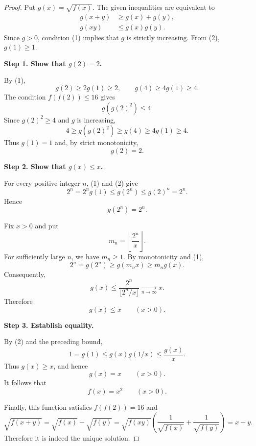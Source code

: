 
\begin{dlsummary}[title={\bfseries Solution 22. The Hidden Quadratic Function},breakable]

\begin{proof}
Put $g(x)=\sqrt{f(x)}$. The given inequalities
are equivalent to
\begin{align}
g(x+y)&\ge g(x)+g(y), \tag{1}\\
g(xy)&\le g(x)g(y). \tag{2}
\end{align}
Since $g>0$, condition (1) implies that $g$
is strictly increasing. From (2), $g(1)\ge1$.

\medskip
\noindent\textbf{Step 1. Show that $g(2)=2$.}

By (1),
\[
g(2)\ge2g(1)\ge2,\qquad
g(4)\ge4g(1)\ge4.
\]
The condition $f(f(2))\le16$ gives
\[
g(g(2)^2)\le4.
\]
Since $g(2)^2\ge4$ and $g$ is increasing,
\[
4\ge g(g(2)^2)\ge g(4)
\ge4g(1)\ge4.
\]
Thus $g(1)=1$ and, by strict monotonicity,
\[
\boxed{g(2)=2.}
\]

\medskip
\noindent\textbf{Step 2. Show that $g(x)\le x$.}

For every positive integer $n$, (1) and (2)
give
\[
2^n=2^n g(1)
\le g(2^n)\le g(2)^n=2^n.
\]
Hence
\[
\boxed{g(2^n)=2^n.}
\]

Fix $x>0$ and put
\[
m_n=\left\lfloor\frac{2^n}{x}\right\rfloor.
\]
For sufficiently large $n$, we have $m_n\ge1$.
By monotonicity and (1),
\[
2^n=g(2^n)\ge g(m_nx)\ge m_ng(x).
\]
Consequently,
\[
g(x)\le
\frac{2^n}{\lfloor2^n/x\rfloor}
\xrightarrow[n\to\infty]{}x.
\]
Therefore
\[
\boxed{g(x)\le x\qquad(x>0).}
\]

\medskip
\noindent\textbf{Step 3. Establish equality.}

By (2) and the preceding bound,
\[
1=g(1)
\le g(x)g(1/x)
\le \frac{g(x)}{x}.
\]
Thus $g(x)\ge x$, and hence
\[
g(x)=x\qquad(x>0).
\]
It follows that
\[
\boxed{f(x)=x^2\qquad(x>0).}
\]

Finally, this function satisfies $f(f(2))=16$
and
\[
\sqrt{f(x+y)}
=\sqrt{f(x)}+\sqrt{f(y)}
=\sqrt{f(xy)}
\left(
\frac1{\sqrt{f(x)}}+
\frac1{\sqrt{f(y)}}
\right)
=x+y.
\]
Therefore it is indeed the unique solution.
\end{proof}

\end{dlsummary}